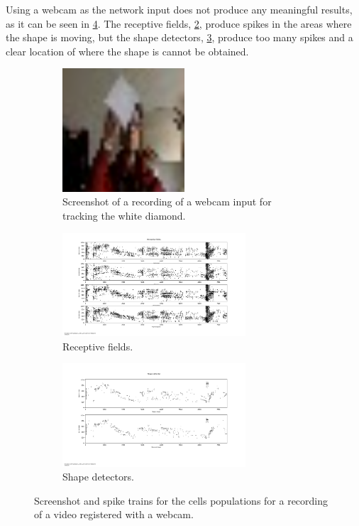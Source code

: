 Using a webcam as the network input does not produce any meaningful results, as it can be seen in \cref{fig:webcam_results}. The receptive fields, \cref{fig:receptive_fields_webcam_input}, produce spikes in the areas where the shape is moving, but the shape detectors, \cref{fig:shape_webcam_input}, produce too many spikes and a clear location of where the shape is cannot be obtained. 

\begin{figure}[ht]
\centering
\begin{subfigure}{0.45\textwidth}
\centering
\includegraphics[width=0.5\textwidth]{images/evaluation/webcam_input.png} 
\caption{Screenshot of a recording of a webcam input for tracking the white diamond.}
\label{fig:webcam_input}
\end{subfigure}

\begin{subfigure}{\textwidth}
\centering
\includegraphics[width=0.75\textwidth]{images/evaluation/receptive_fields_webcam_input.png}
\caption{Receptive fields.}
\label{fig:receptive_fields_webcam_input}
\end{subfigure}

\begin{subfigure}{\textwidth}
\centering
\includegraphics[width=0.75\textwidth]{images/evaluation/shape_webcam_input.png}
\caption{Shape detectors.}
\label{fig:shape_webcam_input}
\end{subfigure}

\caption[Webcam Input Results]{Screenshot and spike trains for the cells populations for a recording of a video registered with a webcam.}
\label{fig:webcam_results}
\end{figure}
